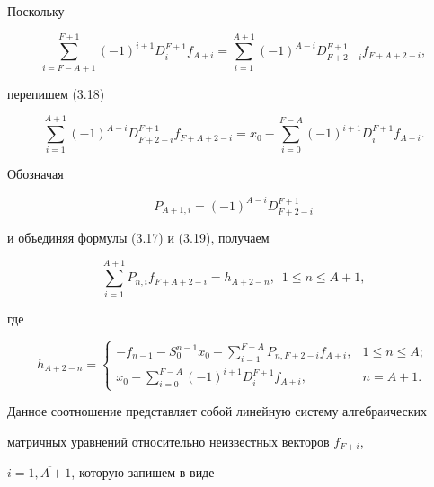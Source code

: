 Поскольку


$$


\sum_{i=F-A+1}^{F+1}(-1)^{i+1}D_{i}^{F+1}f_{A+i}=


\sum_{i=1}^{A+1}(-1)^{A-i}D_{F+2-i}^{F+1}f_{F+A+2-i},


$$


перепишем (3.18)


\begin{equation}


\sum_{i=1}^{A+1}(-1)^{A-i}D_{F+2-i}^{F+1}f_{F+A+2-i}=


x_{0}-\sum_{i=0}^{F-A}(-1)^{i+1}D_{i}^{F+1}f_{A+i}.


\end{equation}


Обозначая


\begin{equation}


P_{A+1,i}=(-1)^{A-i}D_{F+2-i}^{F+1}


\end{equation}


и объединяя формулы (3.17) и (3.19), получаем


\begin{equation}


\sum_{i=1}^{A+1}P_{n,i}f_{F+A+2-i}=h_{A+2-n},\ \;1\leq n\leq A+1,


\end{equation}


где


$$


h_{A+2-n}=


\begin{cases}


-f_{n-1}-S_{0}^{n-1}x_{0}-\sum\limits_{i=1}^{F-A}P_{n,F+2-i}f_{A+i}, &


1\leq n\leq A; \\


x_{0}-\sum\limits_{i=0}^{F-A}(-1)^{i+1}D_{i}^{F+1}f_{A+i}, &


n=A+1.


\end{cases}


$$





Данное соотношение представляет собой линейную систему алгебраических


матричных уравнений относительно неизвестных векторов $f_{F+i}$,


$i=\overline{1,A+1}$, которую запишем в виде


